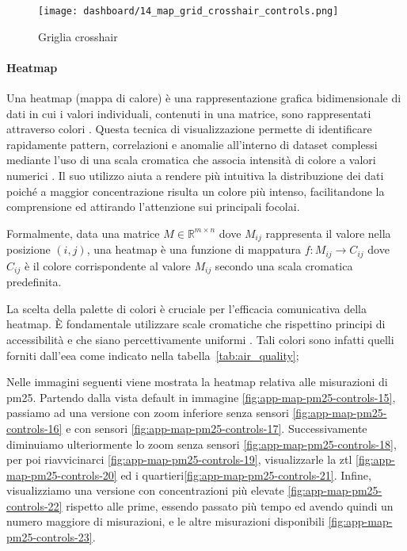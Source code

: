 \begin{figure}[H]
  \centering
  \texttt{[image: dashboard/14\_map\_grid\_crosshair\_controls.png]}
  \caption{Griglia crosshair}
  \label{fig:map-grid-crosshair}
\end{figure}

\newpage

\paragraph{Heatmap}

Una heatmap (mappa di calore) è una rappresentazione grafica bidimensionale di dati in cui i valori individuali,
contenuti in una matrice, sono rappresentati attraverso colori \citep{wilkinson2009grammar}.
Questa tecnica di visualizzazione permette di identificare rapidamente pattern, correlazioni e anomalie
all'interno di dataset complessi mediante l'uso di una scala cromatica che associa intensità di colore
a valori numerici \citep{cleveland1993visualizing}. Il suo utilizzo aiuta a rendere più intuitiva la distribuzione
dei dati poiché a maggior concentrazione risulta un colore più intenso, facilitandone la comprensione ed attirando
l'attenzione sui principali focolai.

Formalmente, data una matrice $M \in \mathbb{R}^{m \times n}$ dove $M_{ij}$ rappresenta il valore
nella posizione $(i,j)$, una heatmap è una funzione di mappatura $ f: M_{ij} \rightarrow C_{ij} $
dove $C_{ij}$ è il colore corrispondente al valore $M_{ij}$ secondo una scala cromatica predefinita.

La scelta della palette di colori è cruciale per l'efficacia comunicativa della heatmap.
È fondamentale utilizzare scale cromatiche che rispettino principi di accessibilità e che siano percettivamente
uniformi \citep{ware2012information}.
Tali colori sono infatti quelli forniti dall'\acrfull{eea} come indicato nella tabella~\ref{tab:air_quality};

Nelle immagini seguenti viene mostrata la heatmap relativa alle misurazioni di \acrshort{pm25}.
Partendo dalla vista default in immagine \ref{fig:app-map-pm25-controls-15},
passiamo ad una versione con zoom inferiore senza sensori \ref{fig:app-map-pm25-controls-16} e
con sensori \ref{fig:app-map-pm25-controls-17}.
Successivamente diminuiamo ulteriormente lo zoom senza sensori \ref{fig:app-map-pm25-controls-18}, per poi
riavvicinarci \ref{fig:app-map-pm25-controls-19},
visualizzarle la \acrshort{ztl} \ref{fig:app-map-pm25-controls-20} ed i quartieri\ref{fig:app-map-pm25-controls-21}.
Infine, visualizziamo una versione con concentrazioni più elevate \ref{fig:app-map-pm25-controls-22}
rispetto alle prime, essendo passato più tempo ed avendo quindi un numero maggiore di misurazioni, e le altre
misurazioni disponibili \ref{fig:app-map-pm25-controls-23}.


